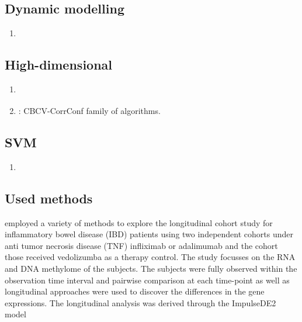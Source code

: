 \documentclass[]{article}
\begin{document}
		\subsection{Dynamic modelling }
		\begin{enumerate}
			\item \cite{Dingetal2019}
		\end{enumerate}
		
		
		
		\subsection{High-dimensional}
		\begin{enumerate}
			\item \cite{Moretal2022}
			\item \cite{McKennanNicolae2022}: CBCV-CorrConf family of algorithms.
		\end{enumerate}
		
		\subsection{SVM}
		\begin{enumerate}
			\item \cite{Zhouetal2019}
		\end{enumerate}
		
		
		
		
		
		\subsection{Used methods}
		\cite{Mishraetal2022} employed a variety of methods to explore the longitudinal cohort study for inflammatory bowel disease (IBD) patients using two independent cohorts under anti tumor necrosis disease (TNF) infliximab or adalimumab and the cohort those received  vedolizumba as a therapy control. The study focusses on the RNA and DNA methylome of the subjects. The subjects were fully observed within the observation time interval and pairwise comparison at each time-point as well as longitudinal approaches were used to discover the differences in the gene expressions. The longitudinal analysis was derived through the ImpulseDE2 model \citep{Fischer2018}
		
		
		
		
		
		
		
\end{document}
